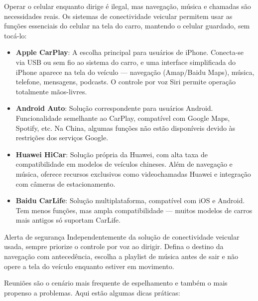
Operar o celular enquanto dirige é ilegal, mas navegação, música e chamadas são necessidades reais. Os sistemas de conectividade veicular permitem usar as funções essenciais do celular na tela do carro, mantendo o celular guardado, sem tocá-lo:

\begin{itemize}
  \item \textbf{Apple CarPlay}: A escolha principal para usuários de iPhone. Conecta-se via USB ou sem fio ao sistema do carro, e uma interface simplificada do iPhone aparece na tela do veículo — navegação (Amap/Baidu Maps), música, telefone, mensagens, podcasts. O controle por voz Siri permite operação totalmente mãos-livres.
  \item \textbf{Android Auto}: Solução correspondente para usuários Android. Funcionalidade semelhante ao CarPlay, compatível com Google Maps, Spotify, etc. Na China, algumas funções não estão disponíveis devido às restrições dos serviços Google.
  \item \textbf{Huawei HiCar}: Solução própria da Huawei, com alta taxa de compatibilidade em modelos de veículos chineses. Além de navegação e música, oferece recursos exclusivos como videochamadas Huawei e integração com câmeras de estacionamento.
  \item \textbf{Baidu CarLife}: Solução multiplataforma, compatível com iOS e Android. Tem menos funções, mas ampla compatibilidade — muitos modelos de carros mais antigos só suportam CarLife.
\end{itemize}

\begin{tcbwarn}{Alerta de segurança}
Independentemente da solução de conectividade veicular usada, sempre priorize o controle por voz ao dirigir. Defina o destino da navegação com antecedência, escolha a playlist de música antes de sair e não opere a tela do veículo enquanto estiver em movimento.

\end{tcbwarn}


Reuniões são o cenário mais frequente de espelhamento e também o mais propenso a problemas. Aqui estão algumas dicas práticas:

